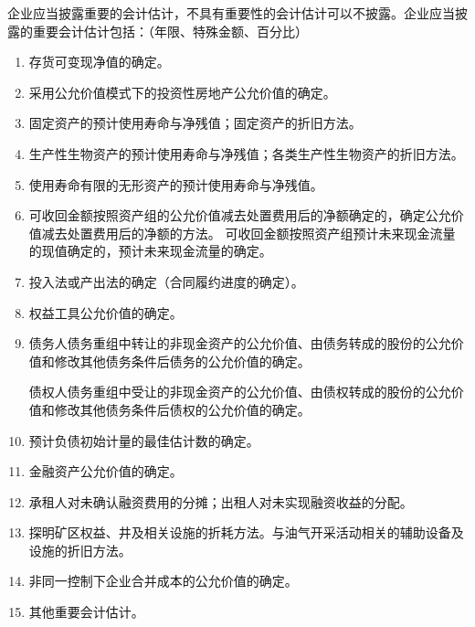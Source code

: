 \documentclass[UTF8,12pt]{ctexart}
\numberwithin{equation}{section} %
\numberwithin{figure}{section}
\numberwithin{table}{section}
\begin{document}
	企业应当披露重要的会计估计，不具有重要性的会计估计可以不披露。企业应当披露的重要会计估计包括：（年限、特殊金额、百分比）
	\begin{enumerate}
		\item 存货可变现净值的确定。
		
		\item 采用公允价值模式下的投资性房地产公允价值的确定。
		
		\item 固定资产的预计使用寿命与净残值；固定资产的折旧方法。
		
		\item 生产性生物资产的预计使用寿命与净残值；各类生产性生物资产的折旧方法。
		
		\item 使用寿命有限的无形资产的预计使用寿命与净残值。
		
		\item 可收回金额按照资产组的公允价值减去处置费用后的净额确定的，确定公允价值减去处置费用后的净额的方法。
		可收回金额按照资产组预计未来现金流量的现值确定的，预计未来现金流量的确定。
		
		\item 投入法或产出法的确定（合同履约进度的确定）。
		
		\item 权益工具公允价值的确定。
		
		\item 债务人债务重组中转让的非现金资产的公允价值、由债务转成的股份的公允价值和修改其他债务条件后债务的公允价值的确定。
		
		债权人债务重组中受让的非现金资产的公允价值、由债权转成的股份的公允价值和修改其他债务条件后债权的公允价值的确定。
		
		\item 预计负债初始计量的最佳估计数的确定。
		
		\item 金融资产公允价值的确定。
		
		\item 承租人对未确认融资费用的分摊；出租人对未实现融资收益的分配。
		
		\item 探明矿区权益、井及相关设施的折耗方法。与油气开采活动相关的辅助设备及设施的折旧方法。
		
		\item 非同一控制下企业合并成本的公允价值的确定。
		
		\item 其他重要会计估计。
	\end{enumerate}
	
\end{document}
